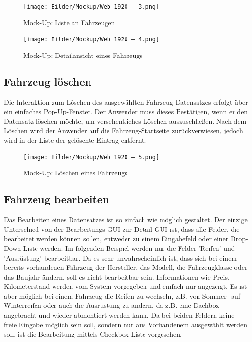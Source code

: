 \newpage

\begin{figure}[!ht]
    \centering
    \texttt{[image: Bilder/Mockup/Web 1920 – 3.png]}
    \caption{Mock-Up: Liste an Fahrzeugen}
    \label{mu:fahrzeugliste}
\end{figure}

\begin{figure}[!ht]
    \centering
    \texttt{[image: Bilder/Mockup/Web 1920 – 4.png]}
    \caption{Mock-Up: Detailansicht eines Fahrzeugs}
    \label{mu:fahrzeugdetails}
\end{figure}

\newpage

\subsection{Fahrzeug löschen}

Die Interaktion zum Löschen des ausgewählten Fahrzeug-Datensatzes erfolgt über ein einfaches Pop-Up-Fenster. Der Anwender muss dieses Bestätigen, wenn er den Datensatz löschen möchte, um versehentliches Löschen auszuschließen. Nach dem Löschen wird der Anwender auf die Fahrzeug-Startseite zurückverwiesen, jedoch wird in der Liste der gelöschte Eintrag entfernt. 


\begin{figure}[!ht]
    \centering
    \texttt{[image: Bilder/Mockup/Web 1920 – 5.png]}
    \caption{Mock-Up: Löschen eines Fahrzeugs}
    \label{mu:loeschen}
\end{figure}

\newpage

\subsection{Fahrzeug bearbeiten}

Das Bearbeiten eines Datensatzes ist so einfach wie möglich gestaltet. Der einzige Unterschied von der Bearbeitungs-GUI zur Detail-GUI ist, dass alle Felder, die bearbeitet werden können sollen, entweder zu einem Eingabefeld oder einer Drop-Down-Liste werden. Im folgenden Beispiel werden nur die Felder 'Reifen' und 'Ausrüstung' bearbeitbar. Da es sehr unwahrscheinlich ist, dass sich bei einem bereits vorhandenen Fahrzeug der Hersteller, das Modell, die Fahrzeugklasse oder das Baujahr ändern, soll es nicht bearbeitbar sein. Informationen wie Preis, Kilometerstand werden vom System vorgegeben und einfach nur angezeigt. Es ist aber möglich bei einem Fahrzeug die Reifen zu wechseln, z.B. von Sommer- auf Winterreifen oder auch die Ausrüstung zu ändern, da z.B. eine Dachbox angebracht und wieder abmontiert werden kann. Da bei beiden Feldern keine freie Eingabe möglich sein soll, sondern nur aus Vorhandenem ausgewählt werden soll, ist die Bearbeitung mittels Checkbox-Liste vorgesehen. 



